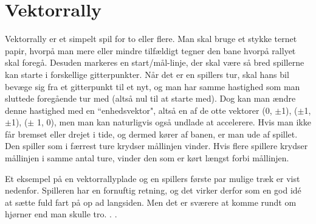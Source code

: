 \chapter{Vektorrally}

Vektorrally er et simpelt spil for to eller flere. Man skal bruge et stykke ternet papir, hvorpå man mere eller mindre tilfældigt tegner den bane hvorpå rallyet skal foregå. Desuden markeres en start/mål-linje, der skal være så bred spillerne kan starte i forskellige gitterpunkter. Når det er en spillers tur, skal hans bil bevæge sig fra et gitterpunkt til et nyt, og man har samme hastighed som man sluttede foregående tur med (altså nul til at starte med). Dog kan man ændre denne hastighed med en ``enhedsvektor", altså en af de otte vektorer (0, $\pm$1), ($\pm$1, $\pm$1), ($\pm$ 1, 0), men man kan naturligvis også undlade at accelerere. Hvis man ikke får bremset eller drejet i tide, og dermed kører af banen, er man ude af spillet. Den spiller som i færrest ture krydser mållinjen vinder. Hvis flere spillere krydser mållinjen i samme antal ture, vinder den som er kørt længst forbi mållinjen.

Et eksempel på en vektorrallyplade og en spillers første par mulige træk er vist nedenfor. Spilleren har en fornuftig retning, og det virker derfor som en god idé at sætte fuld fart på op ad langsiden. Men det er sværere at komme rundt om hjørner end man skulle tro. . .